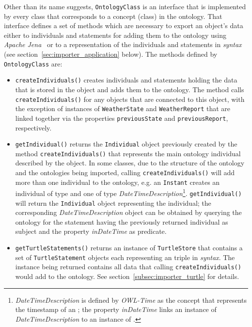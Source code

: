 Other than its name suggests, \texttt{OntologyClass} is an interface that is implemented by every class that corresponds to a concept (class) in the ontology. That interface defines a set of methods which are necessary to export an object's data either to individuals and statements for adding them to the ontology using \emph{Apache Jena}~\cite{apache_jena} or to a representation of the individuals and statements in \emph{ syntax} (see section~\ref{sec:importer_application} below). The methods defined by \texttt{OntologyClass} are:
\begin{itemize}
  \item \texttt{createIndividuals()} creates individuals and statements holding the data that is stored in the object and adds them to the ontology. The method calls \texttt{createIndividuals()} for any objects that are connected to this object, with the exception of instances of \texttt{Weather\hspace{0pt}State} and \texttt{Weather\hspace{0pt}Report} that are linked together via the properties \texttt{previousState} and \texttt{previousReport}, respectively.
  
  \item \texttt{getIndividual()} returns the \texttt{Individual} object previously created by the method \texttt{createIndividuals()} that represents the main ontology individual described by the object. In some classes, due to the structure of the \smarthomeweather ontology and the ontologies being imported, calling \texttt{createIndividuals()} will add more than one individual to the ontology, e.g. an \texttt{Instant} creates an individual of type  and one of type \emph{DateTimeDescription}\footnote{\emph{DateTimeDescription} is defined by \emph{OWL-Time} as the concept that represents the timestamp of an ; the property \emph{inDateTime} links an instance of \emph{DateTimeDescription} to an instance of .}. \texttt{getIndividual()} will return the \texttt{Individual} object representing the  individual; the corresponding \emph{DateTimeDescription} object can be obtained by querying the ontology for the statement having the previously returned
   individual as subject and the property \emph{inDateTime} as predicate.
  
  \item \texttt{getTurtleStatements()} returns an instance of \texttt{TurtleStore} that contains a set of \texttt{TurtleStatement} objects each representing an  triple in \emph{ syntax}. The instance being returned contains all data that calling \texttt{createIndividuals()} would add to the ontology. See section~\ref{subsec:importer_turtle} for details.
  

\end{itemize}

